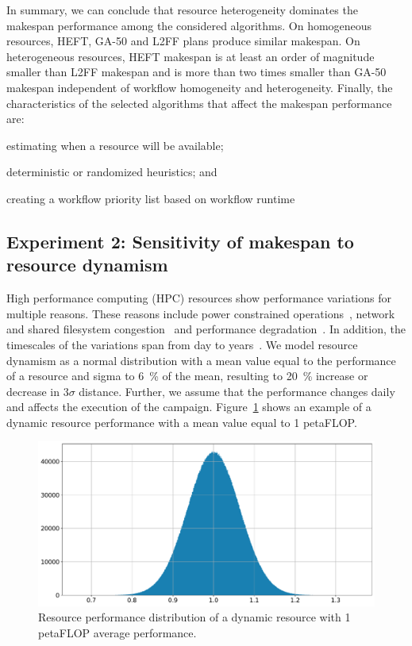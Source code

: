 In summary, we can conclude that resource heterogeneity dominates the makespan performance among the considered algorithms.
On homogeneous resources, HEFT, GA-50 and L2FF plans produce similar makespan.
On heterogeneous resources, HEFT makespan is at least an order of magnitude smaller than L2FF makespan and is more than two times smaller than GA-50 makespan independent of workflow homogeneity and heterogeneity.
Finally, the characteristics of the selected algorithms that affect the makespan performance are:
\begin{inparaenum}[1)]
    \item estimating when a resource will be available;
    \item deterministic or randomized heuristics; and
    \item creating a workflow priority list based on workflow runtime
\end{inparaenum}

\subsection{Experiment 2: Sensitivity of makespan to resource dynamism}

High performance computing (HPC) resources show performance variations for multiple reasons.
These reasons include power constrained operations~\cite{inadomi2015analyzing}, network and shared filesystem congestion~\cite{brown2018interference} and performance degradation~\cite{wu2017survey}.
In addition, the timescales of the variations span from day to years~\cite{skinner2005understanding}.
We model resource dynamism as a normal distribution with a mean value equal to the performance of a resource and sigma to 6~\% of the mean, resulting to 20~\% increase or decrease in $3\sigma$ distance.
Further, we assume that the performance changes daily and affects the execution of the campaign.
Figure~\ref{fig:dynamic_res} shows an example of a dynamic resource performance with a mean value equal to 1 petaFLOP.

\begin{figure}[ht!]
    \centering
    \includegraphics[width=.95\textwidth]{figures/campaign/DynRes.pdf}
    \caption{Resource performance distribution of a dynamic resource with 1 petaFLOP average performance.}
    \label{fig:dynamic_res}
\end{figure}

